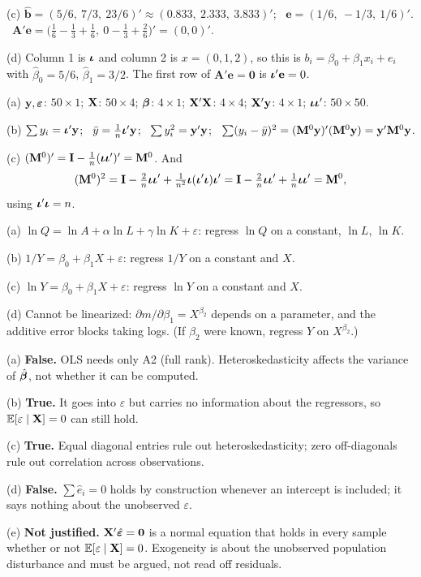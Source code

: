 \documentclass[11pt]{article}
\begin{document}
(c) $\hat{\mathbf b}=(5/6,\ 7/3,\ 23/6)'\approx(0.833,\ 2.333,\ 3.833)'$; \ $\mathbf e=(1/6,\ -1/3,\ 1/6)'$. \ $\mathbf A'\mathbf e=\big(\tfrac16-\tfrac13+\tfrac16,\ 0-\tfrac13+\tfrac26\big)'=(0,0)'$.

(d) Column 1 is $\bm{\iota}$ and column 2 is $x=(0,1,2)$, so this is $b_i=\beta_0+\beta_1x_i+e_i$ with $\hat\beta_0=5/6$, $\hat\beta_1=3/2$. The first row of $\mathbf A'\mathbf e=\mathbf0$ is $\bm{\iota}'\mathbf e=0$.

(a) $\mathbf{y},\bm{\varepsilon}$: $50\times1$; $\mathbf{X}$: $50\times4$; $\bm{\beta}$: $4\times1$; $\mathbf{X}'\mathbf{X}$: $4\times4$; $\mathbf{X}'\mathbf{y}$: $4\times1$; $\bm{\iota}\bm{\iota}'$: $50\times50$.

(b) $\sum y_i=\bm{\iota}'\mathbf{y}$; \ $\bar{y}=\tfrac1n\bm{\iota}'\mathbf{y}$; \ $\sum y_i^2=\mathbf{y}'\mathbf{y}$; \ $\sum(y_i-\bar{y})^2=(\mathbf{M}^0\mathbf{y})'(\mathbf{M}^0\mathbf{y})=\mathbf{y}'\mathbf{M}^0\mathbf{y}$.

(c) $(\mathbf{M}^0)'=\mathbf{I}-\tfrac1n(\bm{\iota}\bm{\iota}')'=\mathbf{M}^0$. And
\[ (\mathbf{M}^0)^2=\mathbf{I}-\tfrac2n\bm{\iota}\bm{\iota}'+\tfrac1{n^2}\bm{\iota}(\bm{\iota}'\bm{\iota})\bm{\iota}'=\mathbf{I}-\tfrac2n\bm{\iota}\bm{\iota}'+\tfrac1n\bm{\iota}\bm{\iota}'=\mathbf{M}^0, \]
using $\bm{\iota}'\bm{\iota}=n$.

(a) $\ln Q=\ln A+\alpha\ln L+\gamma\ln K+\varepsilon$: regress $\ln Q$ on a constant, $\ln L$, $\ln K$.

(b) $1/Y=\beta_0+\beta_1X+\varepsilon$: regress $1/Y$ on a constant and $X$.

(c) $\ln Y=\beta_0+\beta_1X+\varepsilon$: regress $\ln Y$ on a constant and $X$.

(d) Cannot be linearized: $\partial m/\partial\beta_1=X^{\beta_2}$ depends on a parameter, and the additive error blocks taking logs. (If $\beta_2$ were known, regress $Y$ on $X^{\beta_2}$.)

(a) \textbf{False.} OLS needs only A2 (full rank). Heteroskedasticity affects the variance of $\hat{\bm{\beta}}$, not whether it can be computed.

(b) \textbf{True.} It goes into $\varepsilon$ but carries no information about the regressors, so $\mathbb{E}[\varepsilon\mid\mathbf{X}]=0$ can still hold.

(c) \textbf{True.} Equal diagonal entries rule out heteroskedasticity; zero off-diagonals rule out correlation across observations.

(d) \textbf{False.} $\sum\hat e_i=0$ holds by construction whenever an intercept is included; it says nothing about the unobserved $\varepsilon$.

(e) \textbf{Not justified.} $\mathbf{X}'\hat{\bm{\varepsilon}}=\mathbf0$ is a normal equation that holds in every sample whether or not $\mathbb{E}[\varepsilon\mid\mathbf{X}]=0$. Exogeneity is about the unobserved population disturbance and must be argued, not read off residuals.
\end{document}
